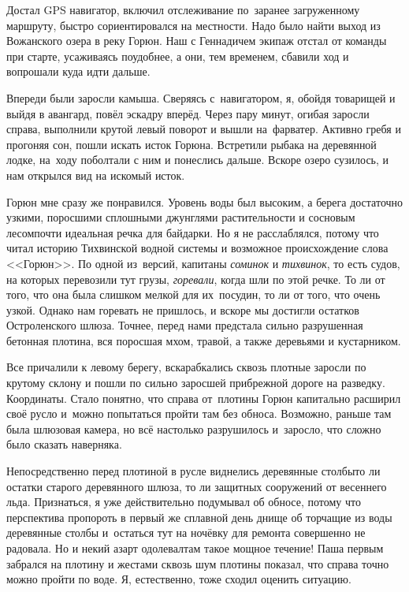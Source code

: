 Достал GPS навигатор, включил отслеживание по~заранее загруженному маршруту, быстро сориентировался на местности. Надо было найти выход из Вожанского озера в реку Горюн. Наш с Геннадичем экипаж отстал от команды при старте, усаживаясь поудобнее, а они, тем временем, сбавили ход и вопрошали куда идти дальше. 

Впереди были заросли камыша. Сверяясь с~навигатором, я, обойдя товарищей и выйдя в авангард, повёл эскадру вперёд. Через пару минут, огибая заросли справа, выполнили крутой левый поворот и вышли на~фарватер. Активно гребя и прогоняя сон, пошли искать исток Горюна. Встретили рыбака на деревянной лодке, на~ходу поболтали с ним и понеслись дальше. Вскоре озеро сузилось, и нам открылся вид на искомый исток.

Горюн мне сразу же понравился. Уровень воды был высоким, а берега достаточно узкими, поросшими сплошными джунглями растительности и сосновым лесом\mdash почти идеальная речка для байдарки. Но я не расслаблялся, потому что читал историю Тихвинской водной системы и возможное происхождение слова <<Горюн>>. По одной из~версий, капитаны \textit{соминок} и \textit{тихвинок}, то есть судов, на которых перевозили тут грузы, \textit{горевали}, когда шли по этой речке. То ли от того, что она была слишком мелкой для их~посудин, то ли от того, что очень узкой. Однако нам горевать не пришлось, и вскоре мы достигли остатков Остроленского шлюза. Точнее, перед нами предстала сильно разрушенная бетонная плотина, вся поросшая мхом, травой, а также деревьями и кустарником.  

Все причалили к левому берегу, вскарабкались сквозь плотные заросли по крутому склону и пошли по сильно заросшей прибрежной дороге на разведку. Координаты\mdash \CoordsGorunSixteenPlotina. Стало понятно, что справа от~плотины Горюн капитально расширил своё русло и~можно попытаться пройти там без обноса. Возможно, раньше там была шлюзовая камера, но всё настолько разрушилось и~заросло, что сложно было сказать наверняка. 

Непосредственно перед плотиной в русле виднелись деревянные столбы\mdash то ли остатки старого деревянного шлюза, то ли защитных сооружений от весеннего льда. Признаться, я уже действительно подумывал об обносе, потому что перспектива пропороть в первый же сплавной день днище об торчащие из воды деревянные столбы и~остаться тут на ночёвку для ремонта совершенно не радовала. Но и некий азарт одолевал\mdash там такое мощное течение! Паша первым забрался на плотину и жестами сквозь шум плотины показал, что справа точно можно пройти по воде. Я, естественно, тоже сходил оценить ситуацию. 

